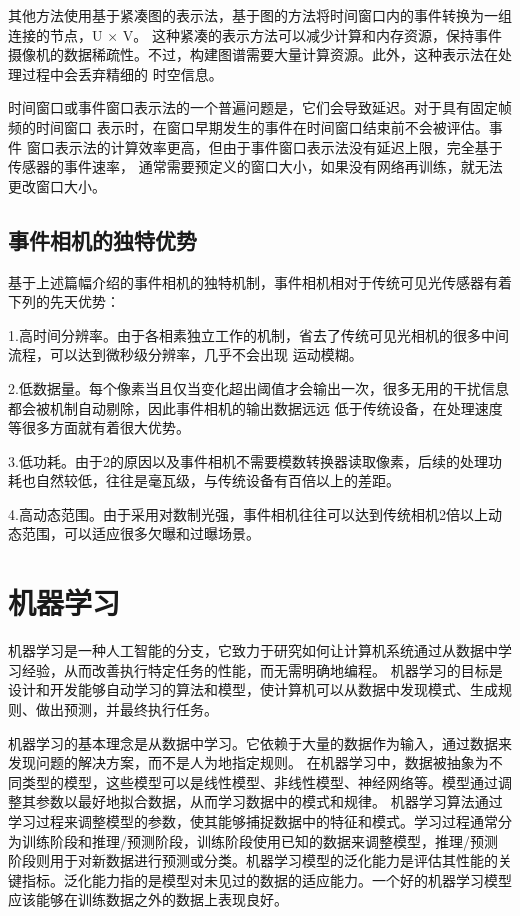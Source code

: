 其他方法使用基于紧凑图的表示法，基于图的方法将时间窗口内的事件转换为一组连接的节点，U × V。
这种紧凑的表示方法可以减少计算和内存资源，保持事件摄像机的数据稀疏性。不过，构建图谱需要大量计算资源。此外，这种表示法在处理过程中会丢弃精细的
时空信息。

时间窗口或事件窗口表示法的一个普遍问题是，它们会导致延迟。对于具有固定帧频的时间窗口
表示时，在窗口早期发生的事件在时间窗口结束前不会被评估。事件
窗口表示法的计算效率更高，但由于事件窗口表示法没有延迟上限，完全基于传感器的事件速率，
通常需要预定义的窗口大小，如果没有网络再训练，就无法更改窗口大小。



\subsection{事件相机的独特优势}
基于上述篇幅介绍的事件相机的独特机制，事件相机相对于传统可见光传感器有着下列的先天优势：

1.高时间分辨率。由于各相素独立工作的机制，省去了传统可见光相机的很多中间流程，可以达到微秒级分辨率，几乎不会出现
运动模糊。

2.低数据量。每个像素当且仅当变化超出阈值才会输出一次，很多无用的干扰信息都会被机制自动剔除，因此事件相机的输出数据远远
低于传统设备，在处理速度等很多方面就有着很大优势。

3.低功耗。由于2的原因以及事件相机不需要模数转换器读取像素，后续的处理功耗也自然较低，往往是毫瓦级，与传统设备有百倍以上的差距。

4.高动态范围。由于采用对数制光强，事件相机往往可以达到传统相机2倍以上动态范围，可以适应很多欠曝和过曝场景。

\section{机器学习}
机器学习是一种人工智能的分支，它致力于研究如何让计算机系统通过从数据中学习经验，从而改善执行特定任务的性能，而无需明确地编程。
机器学习的目标是设计和开发能够自动学习的算法和模型，使计算机可以从数据中发现模式、生成规则、做出预测，并最终执行任务。

机器学习的基本理念是从数据中学习。它依赖于大量的数据作为输入，通过数据来发现问题的解决方案，而不是人为地指定规则。
在机器学习中，数据被抽象为不同类型的模型，这些模型可以是线性模型、非线性模型、神经网络等。模型通过调整其参数以最好地拟合数据，从而学习数据中的模式和规律。
机器学习算法通过学习过程来调整模型的参数，使其能够捕捉数据中的特征和模式。学习过程通常分为训练阶段和推理/预测阶段，训练阶段使用已知的数据来调整模型，推理/预测
阶段则用于对新数据进行预测或分类。机器学习模型的泛化能力是评估其性能的关键指标。泛化能力指的是模型对未见过的数据的适应能力。一个好的机器学习模型应该能够在训练数据之外的数据上表现良好。

